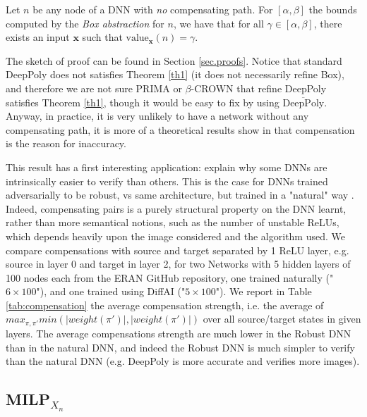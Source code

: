 \documentclass{llncs}
\newcommand{\vx}{\boldsymbol{x}}
\newcommand{\val}{{\textrm{value}}}
\begin{document}
\begin{theorem}
	\label{th1}
	Let $n$ be any node of a DNN with {\em no} compensating path. For $[\alpha,\beta]$ the bounds computed by the {\em Box abstraction} for $n$, we have that for all $\gamma \in [\alpha,\beta]$, there exists an input $\vx$ such that $\val_{\vx}(n)=\gamma$.
\end{theorem}


The sketch of proof can be found in Section \ref{sec.proofs}. 
Notice that standard DeepPoly does not satisfies Theorem \ref{th1} (it does not necessarily refine Box), and therefore we are not sure PRIMA or $\beta$-CROWN that refine DeepPoly satisfies Theorem \ref{th1}, though it would be easy to fix by using $\overline{\text{DeepPoly}}$. Anyway, in practice, it is very unlikely to have a network without any compensating path, it is more of a theoretical results show in that compensation is the reason for inaccuracy.

This result has a first interesting application: explain why some DNNs are intrinsically easier to verify than others. This is the case for DNNs trained adversarially to be robust, vs same architecture, but trained in a "natural" way \cite{deeppoly,prima,crown}. Indeed, compensating pairs is a purely structural property on the DNN learnt, rather than more semantical notions, such as the number of unstable ReLUs, which depends heavily upon the image considered and the algorithm used. We compare compensations with source and target separated by 1 ReLU layer, e.g. source in layer 0 and target in layer 2, for two Networks with 5 hidden layers of 100 nodes each from the ERAN GitHub repository, one trained naturally ("$6\times100$"), 
and one trained using DiffAI \cite{DiffAI} ("$5\times100$"). 
We report in Table \ref{tab:compensation} the average compensation strength, i.e. 
the average of $max_{\pi,\pi'} min(|weight(\pi')|,|weight(\pi')|)$
over all source/target states in given layers. The average compensations strength are much lower in the Robust DNN than in the natural DNN, and indeed the Robust DNN is much simpler to verify than the natural DNN (e.g. DeepPoly is more accurate and verifies more images).


\subsection{MILP$_{X_n}$}
\end{document}
